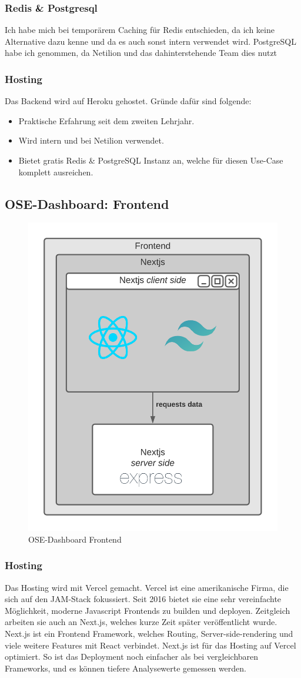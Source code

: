 \subsubsection{Redis \& Postgresql}
Ich habe mich bei temporärem Caching für Redis entschieden, da ich keine Alternative dazu kenne und da es auch sonst intern verwendet wird. PostgreSQL habe ich genommen, da Netilion und das dahinterstehende Team dies nutzt
\subsubsection{Hosting}
Das Backend wird auf Heroku gehostet. Gründe dafür sind folgende:
\begin{itemize}
  \item Praktische Erfahrung seit dem zweiten Lehrjahr.
  \item Wird intern und bei Netilion verwendet.
  \item Bietet gratis Redis \& PostgreSQL Instanz an, welche für diesen Use-Case komplett ausreichen.
\end{itemize}
\subsection{OSE-Dashboard: Frontend} \label{arch-frontend}
\begin{figure}[!ht]
  \centering
  \includegraphics[width=.4\linewidth]{./images/frontend.png}
  \caption[{Diagramm OSE-Dashboard Frontend von Jonas Schultheiss}]{OSE-Dashboard Frontend}
  \label{fig:frontend}
\end{figure}
\subsubsection{Hosting}
Das Hosting wird mit Vercel gemacht. Vercel ist eine amerikanische Firma, die sich auf den JAM-Stack fokussiert. Seit 2016 bietet sie eine sehr vereinfachte Möglichkeit, moderne Javascript Frontends zu builden und deployen. Zeitgleich arbeiten sie auch an Next.js, welches kurze Zeit später veröffentlicht wurde. Next.js ist ein Frontend Framework, welches Routing, Server-side-rendering und viele weitere Features mit React verbindet. Next.js ist für das Hosting auf Vercel optimiert. So ist das Deployment noch einfacher als bei vergleichbaren Frameworks, und es können tiefere Analysewerte gemessen werden.
